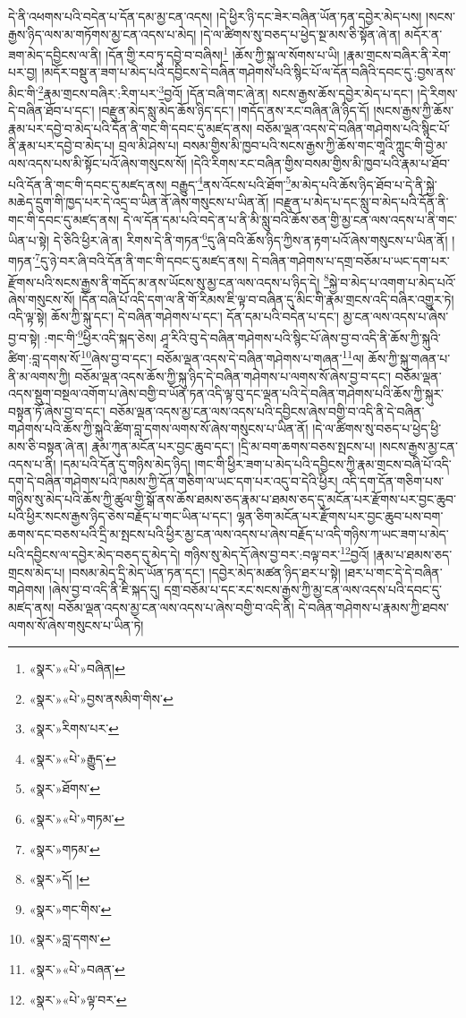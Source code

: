 དེ་ནི་འཕགས་པའི་བདེན་པ་དོན་དམ་མྱ་ངན་འདས། །དེ་ཕྱིར་ཉི་དང་ཟེར་བཞིན་ཡོན་ཏན་དབྱེར་མེད་པས། །སངས་རྒྱས་ཉིད་ལས་མ་གཏོགས་མྱ་ངན་འདས་པ་མེད། །དེ་ལ་ཚིགས་སུ་བཅད་པ་ཕྱེད་སྔ་མས་ཅི་སྟོན་ཞེ་ན། མདོར་ན་ཟག་མེད་དབྱིངས་ལ་ནི། །དོན་གྱི་རབ་ཏུ་དབྱེ་བ་བཞིས།\footnote{«སྣར་»«པེ་»བཞིན།} །ཆོས་ཀྱི་སྐུ་ལ་སོགས་པ་ཡི། །རྣམ་གྲངས་བཞིར་ནི་རེག་པར་བྱ། །མདོར་བསྡུ་ན་ཟག་པ་མེད་པའི་དབྱིངས་དེ་བཞིན་གཤེགས་པའི་སྙིང་པོ་ལ་དོན་བཞིའི་དབང་དུ་:བྱས་ནས་མིང་གི་\footnote{«སྣར་»«པེ་»བྱས་ནསམིག་གིས་}རྣམ་གྲངས་བཞིར་:རིག་པར་\footnote{«སྣར་»རིགས་པར་}བྱའོ། །དོན་བཞི་གང་ཞེ་ན། སངས་རྒྱས་ཆོས་དབྱེར་མེད་པ་དང་། །དེ་རིགས་དེ་བཞིན་ཐོབ་པ་དང་། །བརྫུན་མེད་སླུ་མེད་ཆོས་ཉིད་དང་། །གདོད་ནས་རང་བཞིན་ཞི་ཉིད་དོ། །སངས་རྒྱས་ཀྱི་ཆོས་རྣམ་པར་དབྱེ་བ་མེད་པའི་དོན་ནི་གང་གི་དབང་དུ་མཛད་ནས། བཅོམ་ལྡན་འདས་དེ་བཞིན་གཤེགས་པའི་སྙིང་པོ་ནི་རྣམ་པར་དབྱེ་བ་མེད་པ། བྲལ་མི་ཤེས་པ། བསམ་གྱིས་མི་ཁྱབ་པའི་སངས་རྒྱས་ཀྱི་ཆོས་གང་གཱའི་ཀླུང་གི་བྱེ་མ་ལས་འདས་པས་མི་སྟོང་པའོ་ཞེས་གསུངས་སོ། །དེའི་རིགས་རང་བཞིན་གྱིས་བསམ་གྱིས་མི་ཁྱབ་པའི་རྣམ་པ་ཐོབ་པའི་དོན་ནི་གང་གི་དབང་དུ་མཛད་ནས། བརྒྱུད་\footnote{«སྣར་»«པེ་»རྒྱུད་}ནས་འོངས་པའི་ཐོག་\footnote{«སྣར་»ཐོགས་}མ་མེད་པའི་ཆོས་ཉིད་ཐོབ་པ་དེ་ནི་སྐྱེ་མཆེད་དྲུག་གི་ཁྱད་པར་དེ་འདྲ་བ་ཡིན་ནོ་ཞེས་གསུངས་པ་ཡིན་ནོ། །བརྫུན་པ་མེད་པ་དང་སླུ་བ་མེད་པའི་དོན་ནི་གང་གི་དབང་དུ་མཛད་ནས། དེ་ལ་དོན་དམ་པའི་བདེ་ན་པ་ནི་མི་སླུ་བའི་ཆོས་ཅན་གྱི་མྱ་ངན་ལས་འདས་པ་ནི་གང་ཡིན་པ་སྟེ། དེ་ཅིའི་ཕྱིར་ཞེ་ན། རིགས་དེ་ནི་གཏན་\footnote{«སྣར་»«པེ་»གཏམ་}དུ་ཞི་བའི་ཆོས་ཉིད་ཀྱིས་ན་རྟག་པའོ་ཞེས་གསུངས་པ་ཡིན་ནོ། །གཏན་\footnote{«སྣར་»གཏམ་}དུ་ཉེ་བར་ཞི་བའི་དོན་ནི་གང་གི་དབང་དུ་མཛད་ནས། དེ་བཞིན་གཤེགས་པ་དགྲ་བཅོམ་པ་ཡང་དག་པར་རྫོགས་པའི་སངས་རྒྱས་ནི་གདོད་མ་ནས་ཡོངས་སུ་མྱ་ངན་ལས་འདས་པ་ཉིད་དེ། \footnote{«སྣར་»དོ། ། }སྐྱེ་བ་མེད་པ་འགག་པ་མེད་པའོ་ཞེས་གསུངས་སོ། །དོན་བཞི་པོ་འདི་དག་ལ་ནི་གོ་རིམས་ཇི་ལྟ་བ་བཞིན་དུ་མིང་གི་རྣམ་གྲངས་འདི་བཞིར་འགྱུར་ཏེ། འདི་ལྟ་སྟེ། ཆོས་ཀྱི་སྐུ་དང་། དེ་བཞིན་གཤེགས་པ་དང་། དོན་དམ་པའི་བདེན་པ་དང་། མྱ་ངན་ལས་འདས་པ་ཞེས་བྱ་བ་སྟེ། :གང་གི་\footnote{«སྣར་»གང་གིས་}ཕྱིར་འདི་སྐད་ཅེས། ཤཱ་རིའི་བུ་དེ་བཞིན་གཤེགས་པའི་སྙིང་པོ་ཞེས་བྱ་བ་འདི་ནི་ཆོས་ཀྱི་སྐུའི་ཚིག་:བླ་དགས་སོ་\footnote{«སྣར་»བླ་དགས་}ཞེས་བྱ་བ་དང་། བཅོམ་ལྡན་འདས་དེ་བཞིན་གཤེགས་པ་གཞན་\footnote{«སྣར་»«པེ་»བཞན་}ལ། ཆོས་ཀྱི་སྐུ་གཞན་པ་ནི་མ་ལགས་ཀྱི། བཅོམ་ལྡན་འདས་ཆོས་ཀྱི་སྐུ་ཉིད་དེ་བཞིན་གཤེགས་པ་ལགས་སོ་ཞེས་བྱ་བ་དང་། བཅོམ་ལྡན་འདས་སྡུག་བསྔལ་འགོག་པ་ཞེས་བགྱི་བ་ཡོན་ཏན་འདི་ལྟ་བུ་དང་ལྡན་པའི་དེ་བཞིན་གཤེགས་པའི་ཆོས་ཀྱི་སྐུར་བསྟན་ཏོ་ཞེས་བྱ་བ་དང་། བཅོམ་ལྡན་འདས་མྱ་ངན་ལས་འདས་པའི་དབྱིངས་ཞེས་བགྱི་བ་འདི་ནི་དེ་བཞིན་གཤེགས་པའི་ཆོས་ཀྱི་སྐུའི་ཚིག་བླ་དགས་ལགས་སོ་ཞེས་གསུངས་པ་ཡིན་ནོ། །དེ་ལ་ཚིགས་སུ་བཅད་པ་ཕྱེད་ཕྱི་མས་ཅི་བསྟན་ཞེ་ན། རྣམ་ཀུན་མངོན་པར་བྱང་ཆུབ་དང་། །དྲི་མ་བག་ཆགས་བཅས་སྤངས་པ། །སངས་རྒྱས་མྱ་ངན་འདས་པ་ནི། །དམ་པའི་དོན་དུ་གཉིས་མེད་ཉིད། །གང་གི་ཕྱིར་ཟག་པ་མེད་པའི་དབྱིངས་ཀྱི་རྣམ་གྲངས་བཞི་པོ་འདི་དག་དེ་བཞིན་གཤེགས་པའི་ཁམས་ཀྱི་དོན་གཅིག་ལ་ཡང་དག་པར་འདུ་བ་དེའི་ཕྱིར། འདི་དག་དོན་གཅིག་པས་གཉིས་སུ་མེད་པའི་ཆོས་ཀྱི་ཚུལ་གྱི་སྒོ་ནས་ཆོས་ཐམས་ཅད་རྣམ་པ་ཐམས་ཅད་དུ་མངོན་པར་རྫོགས་པར་བྱང་ཆུབ་པའི་ཕྱིར་སངས་རྒྱས་ཉིད་ཅེས་བརྗོད་པ་གང་ཡིན་པ་དང་། ལྷན་ཅིག་མངོན་པར་རྫོགས་པར་བྱང་ཆུབ་པས་བག་ཆགས་དང་བཅས་པའི་དྲི་མ་སྤངས་པའི་ཕྱིར་མྱ་ངན་ལས་འདས་པ་ཞེས་བརྗོད་པ་འདི་གཉིས་ཀ་ཡང་ཟག་པ་མེད་པའི་དབྱིངས་ལ་དབྱེར་མེད་བཅད་དུ་མེད་དེ། གཉིས་སུ་མེད་དོ་ཞེས་བྱ་བར་:བལྟ་བར་\footnote{«སྣར་»«པེ་»ལྟ་བར་}བྱའོ། །རྣམ་པ་ཐམས་ཅད་གྲངས་མེད་པ། །བསམ་མེད་དྲི་མེད་ཡོན་ཏན་དང་། །དབྱེར་མེད་མཚན་ཉིད་ཐར་པ་སྟེ། །ཐར་པ་གང་དེ་དེ་བཞིན་གཤེགས། །ཞེས་བྱ་བ་འདི་ནི་ཇི་སྐད་དུ། དགྲ་བཅོམ་པ་དང་རང་སངས་རྒྱས་ཀྱི་མྱ་ངན་ལས་འདས་པའི་དབང་དུ་མཛད་ནས། བཅོམ་ལྡན་འདས་མྱ་ངན་ལས་འདས་པ་ཞེས་བགྱི་བ་འདི་ནི། དེ་བཞིན་གཤེགས་པ་རྣམས་ཀྱི་ཐབས་ལགས་སོ་ཞེས་གསུངས་པ་ཡིན་ཏེ། 